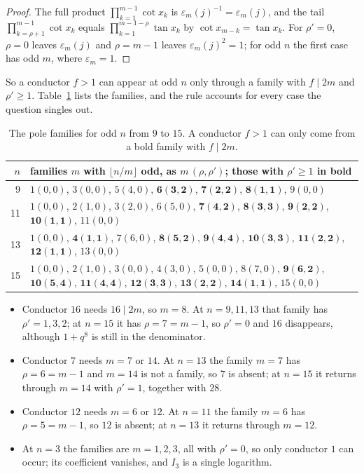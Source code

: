 \documentclass[11pt]{article}
\begin{document}
\begin{proof}
The full product $\prod_{k=1}^{m-1}\cot x_k$ is $\varepsilon_m(j)^{-1}=\varepsilon_m(j)$, and the tail
$\prod_{k=\rho+1}^{m-1}\cot x_k$ equals $\prod_{k=1}^{m-1-\rho}\tan x_k$ by $\cot x_{m-k}=\tan x_k$. For $\rho'=0$,
$\rho=0$ leaves $\varepsilon_m(j)$ and $\rho=m-1$ leaves $\varepsilon_m(j)^2=1$; for odd $n$ the first case has odd $m$,
where $\varepsilon_m=1$.
\end{proof}

So a conductor $f>1$ can appear at odd $n$ only through a family with $f\mid2m$ and $\rho'\ge1$. Table~\ref{tab:fam}
lists the families, and the rule accounts for every case the question singles out.

\begin{table}[ht]
\centering
\small
\begin{tabular}{rp{}}
\toprule
$n$ & families $m$ with $\lfloor n/m\rfloor$ odd, as $m\,(\rho,\rho')$; those with $\rho'\ge1$ in bold \\
\midrule
9 & $1(0,0)$, $3(0,0)$, $5(4,0)$, $\mathbf{6(3,2)}$, $\mathbf{7(2,2)}$, $\mathbf{8(1,1)}$, $9(0,0)$ \\
11 & $1(0,0)$, $2(1,0)$, $3(2,0)$, $6(5,0)$, $\mathbf{7(4,2)}$, $\mathbf{8(3,3)}$, $\mathbf{9(2,2)}$, $\mathbf{10(1,1)}$, $11(0,0)$ \\
13 & $1(0,0)$, $\mathbf{4(1,1)}$, $7(6,0)$, $\mathbf{8(5,2)}$, $\mathbf{9(4,4)}$, $\mathbf{10(3,3)}$, $\mathbf{11(2,2)}$, $\mathbf{12(1,1)}$, $13(0,0)$ \\
15 & $1(0,0)$, $2(1,0)$, $3(0,0)$, $4(3,0)$, $5(0,0)$, $8(7,0)$, $\mathbf{9(6,2)}$, $\mathbf{10(5,4)}$, $\mathbf{11(4,4)}$, $\mathbf{12(3,3)}$, $\mathbf{13(2,2)}$, $\mathbf{14(1,1)}$, $15(0,0)$ \\
\bottomrule
\end{tabular}
\caption{The pole families for odd $n$ from $9$ to $15$. A conductor $f>1$ can only come from a bold family with
$f\mid2m$.}
\label{tab:fam}
\end{table}

\begin{itemize}
\item Conductor $16$ needs $16\mid2m$, so $m=8$. At $n=9,11,13$ that family has $\rho'=1,3,2$; at $n=15$ it has
$\rho=7=m-1$, so $\rho'=0$ and $16$ disappears, although $1+q^8$ is still in the denominator.
\item Conductor $7$ needs $m=7$ or $14$. At $n=13$ the family $m=7$ has $\rho=6=m-1$ and $m=14$ is not a family, so
$7$ is absent; at $n=15$ it returns through $m=14$ with $\rho'=1$, together with $28$.
\item Conductor $12$ needs $m=6$ or $12$. At $n=11$ the family $m=6$ has $\rho=5=m-1$, so $12$ is absent; at $n=13$
it returns through $m=12$.
\item At $n=3$ the families are $m=1,2,3$, all with $\rho'=0$, so only conductor $1$ can occur; its coefficient
vanishes, and $I_3$ is a single logarithm.
\end{itemize}
\end{document}
